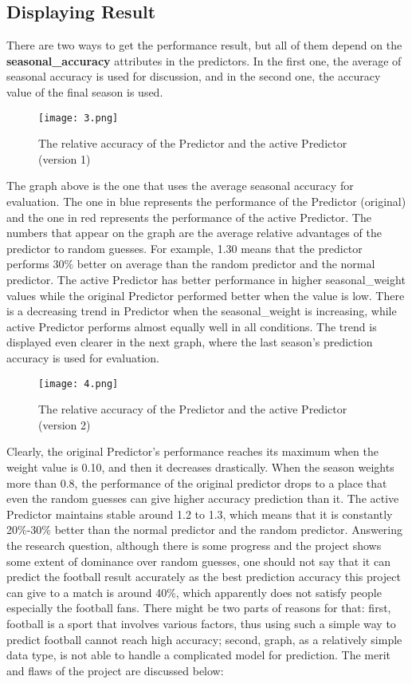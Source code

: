 \documentclass[fontsize=11pt]{article}
\begin{document}
\subsection*{Displaying Result}
There are two ways to get the performance result, but all of them depend on the \textbf{seasonal\_accuracy} attributes in the predictors. In the first one, the average of seasonal accuracy is used for discussion, and in the second one, the accuracy value of the final season is used. 
\begin{figure}[h]
    \centering
    \texttt{[image: 3.png]}
    \caption{The relative accuracy of the Predictor and the active Predictor (version 1)}
    \label{fig:3}
\end{figure}
\newline
The graph above is the one that uses the average seasonal accuracy for evaluation. The one in blue represents the performance of the Predictor (original) and the one in red represents the performance of the active Predictor. The numbers that appear on the graph are the average relative advantages of the predictor to random guesses. For example, 1.30 means that the predictor performs 30\% better on average than the random predictor and the normal predictor. The active Predictor has better performance in higher seasonal\_weight values while the original Predictor performed better when the value is low. There is a decreasing trend in Predictor when the seasonal\_weight is increasing, while active Predictor performs almost equally well in all conditions. The trend is displayed even clearer in the next graph, where the last season's prediction accuracy is used for evaluation.
\begin{figure}[h]
    \centering
    \texttt{[image: 4.png]}
    \caption{The relative accuracy of the Predictor and the active Predictor (version 2)}
    \label{fig:3}
\end{figure}
\newline
Clearly, the original Predictor's performance reaches its maximum when the weight value is 0.10, and then it decreases drastically. When the season weights more than 0.8, the performance of the original predictor drops to a place that even the random guesses can give higher accuracy prediction than it. The active Predictor maintains stable around 1.2 to 1.3, which means that it is constantly 20\%-30\% better than the normal predictor and the random predictor.  
\newline
\newline
Answering the research question, although there is some progress and the project shows some extent of dominance over random guesses, one should not say that it can predict the football result accurately as the best prediction accuracy this project can give to a match is around 40\%, which apparently does not satisfy people especially the football fans. There might be two parts of reasons for that: first, football is a sport that involves various factors, thus using such a simple way to predict football cannot reach high accuracy; second, graph, as a relatively simple data type, is not able to handle a complicated model for prediction. The merit and flaws of the project are discussed below:
\end{document}
